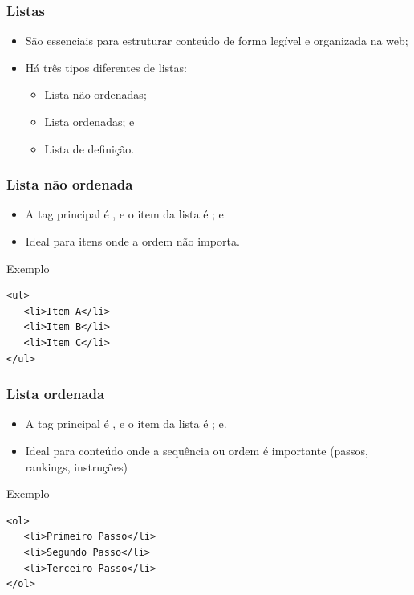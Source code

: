 \documentclass[aspectratio=169]{beamer} %
\begin{document}
\begin{frame}
	\frametitle{Listas}
	
	\begin{itemize}
		\item São essenciais para estruturar conteúdo de forma legível e organizada na web;
		\item Há três tipos diferentes de listas: 
		\begin{itemize}
			\item Lista não ordenadas;
			\item Lista ordenadas; e
			\item Lista de definição.
		\end{itemize}
	\end{itemize}
\end{frame}

\begin{frame}[fragile]
	\frametitle{Lista não ordenada}
	
	\begin{itemize}
		\item A tag principal é , e o  item da lista é ; e
		\item Ideal para itens onde a ordem não importa.
	\end{itemize}\vfill
	
	\begin{exampleblock}{Exemplo}
		\begin{lstlisting}
<ul>
   <li>Item A</li>
   <li>Item B</li>
   <li>Item C</li>
</ul>
		\end{lstlisting}
	\end{exampleblock}
\end{frame}

\begin{frame}[fragile]
	\frametitle{Lista ordenada}
	
	\begin{itemize}
		\item A tag principal é , e o item da lista é ; e.
		\item Ideal para conteúdo onde a sequência ou ordem é importante (passos, rankings, instruções)
	\end{itemize}\vfill
	
	\begin{exampleblock}{Exemplo}
		\begin{lstlisting}
<ol>
   <li>Primeiro Passo</li>
   <li>Segundo Passo</li>
   <li>Terceiro Passo</li>
</ol>
		\end{lstlisting}
	\end{exampleblock}
\end{frame}
\end{document}
